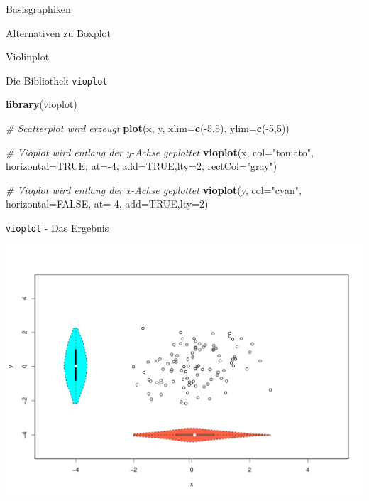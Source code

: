 \documentclass[ignorenonframetext,]{beamer}
\newenvironment{Shaded}{}{}
\newcommand{\KeywordTok}[1]{\textcolor[rgb]{0.00,0.44,0.13}{\textbf{{#1}}}}
\newcommand{\DataTypeTok}[1]{\textcolor[rgb]{0.56,0.13,0.00}{{#1}}}
\newcommand{\DecValTok}[1]{\textcolor[rgb]{0.25,0.63,0.44}{{#1}}}
\newcommand{\StringTok}[1]{\textcolor[rgb]{0.25,0.44,0.63}{{#1}}}
\newcommand{\CommentTok}[1]{\textcolor[rgb]{0.38,0.63,0.69}{\textit{{#1}}}}
\newcommand{\OtherTok}[1]{\textcolor[rgb]{0.00,0.44,0.13}{{#1}}}
\newcommand{\NormalTok}[1]{{#1}}
\begin{document}
\begin{frame}[fragile]{Basisgraphiken}
\begin{block}{Alternativen zu Boxplot}
\begin{block}{Violinplot}
\end{block}

\end{block}

\begin{block}{Die Bibliothek \texttt{vioplot}}

\begin{Shaded}
\begin{Highlighting}[]
\KeywordTok{library}\NormalTok{(vioplot)}

\CommentTok{# Scatterplot wird erzeugt}
\KeywordTok{plot}\NormalTok{(x, y, }\DataTypeTok{xlim=}\KeywordTok{c}\NormalTok{(-}\DecValTok{5}\NormalTok{,}\DecValTok{5}\NormalTok{), }\DataTypeTok{ylim=}\KeywordTok{c}\NormalTok{(-}\DecValTok{5}\NormalTok{,}\DecValTok{5}\NormalTok{))}

\CommentTok{# Vioplot wird entlang der y-Achse geplottet}
\KeywordTok{vioplot}\NormalTok{(x, }\DataTypeTok{col=}\StringTok{"tomato"}\NormalTok{, }\DataTypeTok{horizontal=}\OtherTok{TRUE}\NormalTok{, }\DataTypeTok{at=}\NormalTok{-}\DecValTok{4}\NormalTok{, }
        \DataTypeTok{add=}\OtherTok{TRUE}\NormalTok{,}\DataTypeTok{lty=}\DecValTok{2}\NormalTok{, }\DataTypeTok{rectCol=}\StringTok{"gray"}\NormalTok{)}

\CommentTok{# Vioplot wird entlang der x-Achse geplottet}
\KeywordTok{vioplot}\NormalTok{(y, }\DataTypeTok{col=}\StringTok{"cyan"}\NormalTok{, }\DataTypeTok{horizontal=}\OtherTok{FALSE}\NormalTok{, }\DataTypeTok{at=}\NormalTok{-}\DecValTok{4}\NormalTok{, }
        \DataTypeTok{add=}\OtherTok{TRUE}\NormalTok{,}\DataTypeTok{lty=}\DecValTok{2}\NormalTok{)}
\end{Highlighting}
\end{Shaded}

\end{block}

\begin{block}{\texttt{vioplot} - Das Ergebnis}

\includegraphics{R_intern_files/figure-beamer/unnamed-chunk-169-1.pdf}


\end{block}
\end{frame}
\end{document}
